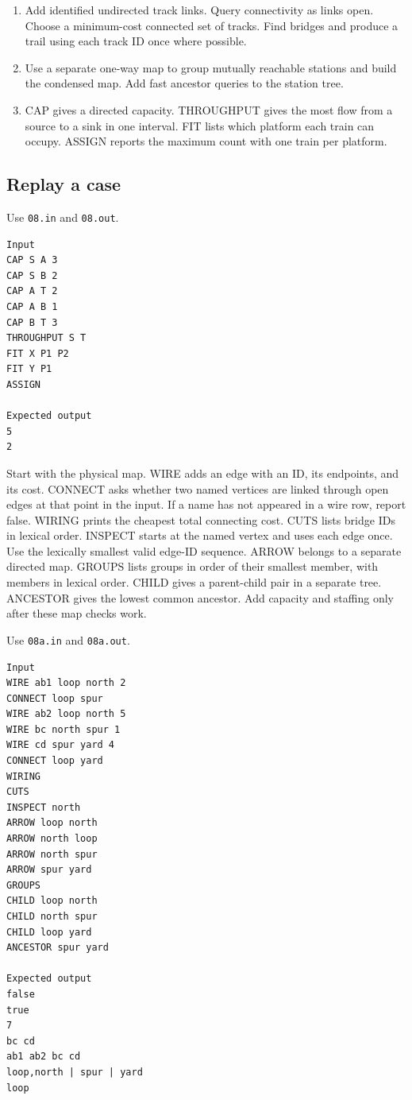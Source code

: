 \documentclass[11pt,letterpaper]{article}
\begin{document}
\begin{enumerate}
\item Add identified undirected track links. Query connectivity as links open. Choose a minimum-cost connected set of tracks. Find bridges and produce a trail using each track ID once where possible.
\item Use a separate one-way map to group mutually reachable stations and build the condensed map. Add fast ancestor queries to the station tree.
\item CAP gives a directed capacity. THROUGHPUT gives the most flow from a source to a sink in one interval. FIT lists which platform each train can occupy. ASSIGN reports the maximum count with one train per platform.
\end{enumerate}

\subsection*{Replay a case}

Use \texttt{08.in} and \texttt{08.out}.

\begin{samepage}
\small
\begin{verbatim}
Input
CAP S A 3
CAP S B 2
CAP A T 2
CAP A B 1
CAP B T 3
THROUGHPUT S T
FIT X P1 P2
FIT Y P1
ASSIGN

Expected output
5
2
\end{verbatim}
\end{samepage}

Start with the physical map. WIRE adds an edge with an ID, its endpoints, and its cost. CONNECT asks whether two named vertices are linked through open edges at that point in the input. If a name has not appeared in a wire row, report false. WIRING prints the cheapest total connecting cost. CUTS lists bridge IDs in lexical order. INSPECT starts at the named vertex and uses each edge once. Use the lexically smallest valid edge-ID sequence. ARROW belongs to a separate directed map. GROUPS lists groups in order of their smallest member, with members in lexical order. CHILD gives a parent-child pair in a separate tree. ANCESTOR gives the lowest common ancestor. Add capacity and staffing only after these map checks work.

Use \texttt{08a.in} and \texttt{08a.out}.

\begin{samepage}
\small
\begin{verbatim}
Input
WIRE ab1 loop north 2
CONNECT loop spur
WIRE ab2 loop north 5
WIRE bc north spur 1
WIRE cd spur yard 4
CONNECT loop yard
WIRING
CUTS
INSPECT north
ARROW loop north
ARROW north loop
ARROW north spur
ARROW spur yard
GROUPS
CHILD loop north
CHILD north spur
CHILD loop yard
ANCESTOR spur yard

Expected output
false
true
7
bc cd
ab1 ab2 bc cd
loop,north | spur | yard
loop
\end{verbatim}
\end{samepage}
\end{document}
